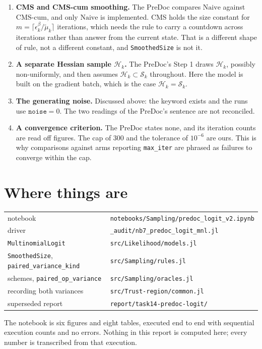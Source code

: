 \documentclass[11pt,a4paper]{article}
\begin{document}
\begin{enumerate}[leftmargin=*]
\item \textbf{CMS and CMS-cum smoothing.} The PreDoc compares $\mathrm{Naive}$
      against $\mathrm{CMS\text{-}cum}$, and only $\mathrm{Naive}$ is implemented.
      CMS holds the size constant for $m = \lceil \epsilon^\beta_k/\tilde\mu_k\rceil$
      iterations, which needs the rule to carry a countdown across iterations rather
      than answer from the current state. That is a different shape of rule, not a
      different constant, and \texttt{SmoothedSize} is not it.

\item \textbf{A separate Hessian sample $\mathcal{H}_k$.} The PreDoc's Step 1 draws
      $\mathcal{H}_k$, possibly non-uniformly, and then assumes
      $\mathcal{H}_k \subset \mathcal{S}_k$ throughout. Here the model is built on
      the gradient batch, which is the case $\mathcal{H}_k = \mathcal{S}_k$.

\item \textbf{The generating noise.} Discussed above: the keyword exists and the
      runs use $\texttt{noise} = 0$. The two readings of the PreDoc's sentence are
      not reconciled.

\item \textbf{A convergence criterion.} The PreDoc states none, and its iteration
      counts are read off figures. The cap of $300$ and the tolerance of $10^{-6}$
      are ours. This is why comparisons against arms reporting \texttt{max\_iter}
      are phrased as failures to converge within the cap.
\end{enumerate}

\section{Where things are}

\begin{center}
\begin{tabular}{ll}
\toprule
notebook & \texttt{notebooks/Sampling/predoc\_logit\_v2.ipynb} \\
driver & \texttt{\_audit/nb7\_predoc\_logit\_mnl.jl} \\
\midrule
\texttt{MultinomialLogit} & \texttt{src/Likelihood/models.jl} \\
\texttt{SmoothedSize}, \texttt{paired\_variance\_kind} & \texttt{src/Sampling/rules.jl} \\
schemes, \texttt{paired\_op\_variance} & \texttt{src/Sampling/oracles.jl} \\
recording both variances & \texttt{src/Trust-region/common.jl} \\
\midrule
superseded report & \texttt{report/task14-predoc-logit/} \\
\bottomrule
\end{tabular}
\end{center}

The notebook is six figures and eight tables, executed end to end with sequential
execution counts and no errors. Nothing in this report is computed here; every
number is transcribed from that execution.
\end{document}
